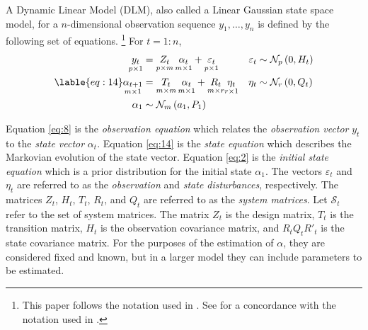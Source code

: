 \documentclass{article}
\newcommand{\dist}[1]{\mathcal{#1}}
\newcommand{\paren}[1]{\ensuremath{\left(#1\right)}}
\newcommand{\dmvnorm}[2]{\ensuremath{\dist{N}_{#2}\paren{#1}}}
\begin{document}
A Dynamic Linear Model (DLM), also called a Linear Gaussian state space model, for a $n$-dimensional observation sequence $y_{1}, \dots, y_{n}$ is defined by the following set of equations.%
\footnote{This paper follows the notation used in \textcite{DurbinKoopman2001}. See \textcite{PetrisPetroneEtAl2009} for a concordance with the notation used in \textcite{WestHarrison1997}.}
For $t = 1:n$,
\begin{align}
  \label{eq:8}
  \underset{p \times 1}{y_t} &= \underset{p \times m}{Z_{t}} \, \underset{m \times 1}{\alpha_t} + \underset{p \times 1}{\varepsilon_t} & \varepsilon_{t} &\sim \dmvnorm{0, H_{t}}{p} \\
  \lable{eq:14}
  \underset{m \times 1}{\alpha_{t+1}} &= \underset{m \times m}{T_{t}} \, \underset{m \times 1}{\alpha_{t}} + \underset{m \times r}{R_{t}}  \underset{r \times 1}{\eta_{t}} & \eta_{t} &\sim \dmvnorm{0, Q_{t}}{r} \\
  \label{eq:2}
  \alpha_{1} & \sim \dmvnorm{a_{1}, P_{1}}{m}
\end{align}

Equation \eqref{eq:8} is the \textit{observation equation} which relates the \textit{observation vector} $y_{t}$ to the \textit{state vector} $\alpha_{t}$.
Equation \eqref{eq:14} is the \textit{state equation} which describes the Markovian evolution of the state vector.
Equation \eqref{eq:2} is the \textit{initial state equation} which is a prior distribution for the initial state $\alpha_{1}$.
The vectors $\varepsilon_{t}$ and $\eta_{t}$ are referred to as the \textit{observation} and \textit{state disturbances}, respectively.
The matrices $Z_{t}$, $H_{t}$, $T_{t}$, $R_{t}$, and $Q_{t}$ are referred to as the \textit{system matrices}.
Let $\mathcal{S}_{t}$ refer to the set of system matrices.
The matrix $Z_{t}$ is the design matrix, $T_{t}$ is the transition matrix, $H_{t}$ is the observation covariance matrix, and $R_{t} Q_{t} R'_{t}$ is the state covariance matrix.
For the purposes of the estimation of $\alpha$, they are considered fixed and known, but in a larger model they can include parameters to be estimated.
\end{document}
